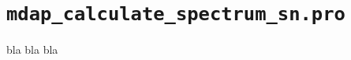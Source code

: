 \section{{\tt mdap\_calculate\_spectrum\_sn.pro}}
\label{dap_sec:mdap_calculate_spectrum_sn}

bla bla bla
